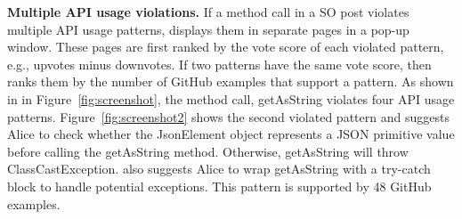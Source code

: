 {\bf Multiple API usage violations.} If a method call in a SO post violates multiple API usage patterns, {\tool} displays them in separate pages in a pop-up window. These pages are first ranked by the vote score of each violated pattern, e.g., upvotes minus downvotes. If two patterns have the same vote score, {\tool} then ranks them by the number of GitHub examples that support a pattern. As shown in  in Figure~\ref{fig:screenshot}, the method call, {\ttt getAsString} violates four API usage patterns. Figure~\ref{fig:screenshot2} shows the second violated pattern and suggests Alice to check whether the {\ttt JsonElement} object represents a {\ttt JSON} primitive value before calling the {\ttt getAsString} method. Otherwise, {\ttt getAsString} will throw {\ttt ClassCastException}. {\tool} also suggests Alice to wrap {\ttt getAsString} with a {\ttt try-catch} block to handle potential exceptions. This pattern is supported by 48 GitHub examples.




